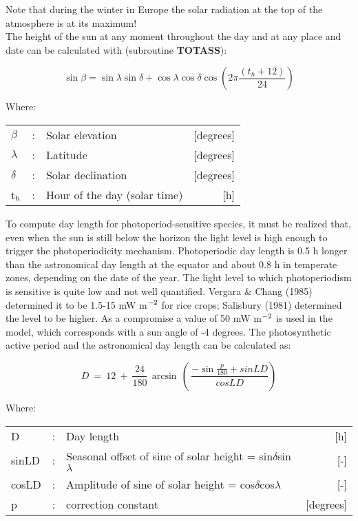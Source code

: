 \documentclass[11pt]{report}
\begin{document}
Note that during the winter in Europe the solar radiation at the top of the atmo\-sphere is at its maximum!\\
The height of the sun at any moment throughout the day and at any place and date can be
calculated with (subroutine {\bf TOTASS}):

\begin{equation}
\sin \beta = \sin \lambda \sin \delta + \cos \lambda \cos \delta \cos (2 \pi {\frac{(t _{h} +12)}{24}} )
\end{equation}

Where:\\
\begin{tabularx}{\textwidth}{llXr}
$\beta$ &:& Solar elevation  & [degrees]\\
$\lambda$ &:& Latitude  & [degrees]\\
$\delta$ &:& Solar declination  & [degrees]\\
t$_{{\rm h}}$ &:& Hour of the day (solar time)  & [h]\\
\end{tabularx}

To compute day length for photoperiod-sensitive species, it must be realized that, even
when the sun is still below the horizon the light level is high enough to trigger the
photoperiodicity mechan\-ism. Photoperiodic day length is 0.5 h longer than the astronomi\-cal day length at the equator and about 0.8 h in temperate zones, depend\-ing on the date of the year. The light level to which photoperiodism is sensitive is quite low and not well
quantified. Vergara \& Chang (1985) determined it to be 1.5-15 mW m$^{{\rm -2}}$ for rice crops; Salisbury (1981) determined the level to be higher. As a compromise a value of 50 mW
m$^{{\rm -2}}$ is used in the model, which corresponds with a sun angle of -4 degrees. The
photosynthetic active period and the astro\-nomical day length can be calculated as:

\begin{equation}
D ~=~ 12~+~{\frac{24}{180}} \, \arcsin \, (\,{\frac{-\sin {\frac{p}{180}} + sinLD}{cosLD}} )
\end{equation}

Where:\\
\begin{tabularx}{\textwidth}{llXr}
D &:& Day length  & [h]\\
sinLD &:& Seasonal offset of sine of solar height = sin$\delta$sin$\lambda$  & [-]\\
cosLD &:& Amplitude of sine of solar height = cos$\delta$cos$\lambda$  & [-]\\
p &:& correction constant  & [degrees]\\
\end{tabularx}
\end{document}
